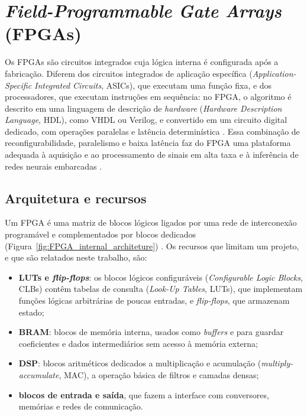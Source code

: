 \section{\textit{Field-Programmable Gate Arrays} (FPGAs)}
\label{sec:FPGA}

Os FPGAs são circuitos integrados cuja lógica interna é configurada após a fabricação. Diferem dos circuitos integrados de aplicação específica (\textit{Application-Specific Integrated Circuits}, ASICs), que executam uma função fixa, e dos processadores, que executam instruções em sequência: no FPGA, o algoritmo é descrito em uma linguagem de descrição de \textit{hardware} (\textit{Hardware Description Language}, HDL), como VHDL ou Verilog, e convertido em um circuito digital dedicado, com operações paralelas e latência determinística \cite{kuon2008fpga,trimberger2015three}. Essa combinação de reconfigurabilidade, paralelismo e baixa latência faz do FPGA uma plataforma adequada à aquisição e ao processamento de sinais em alta taxa e à inferência de redes neurais embarcadas \cite{Shawahna2019}.

\subsection{Arquitetura e recursos}

Um FPGA é uma matriz de blocos lógicos ligados por uma rede de interconexão programável e complementados por blocos dedicados (Figura~\ref{fig:FPGA_internal_architeture}) \cite{langhammer2014design}. Os recursos que limitam um projeto, e que são relatados neste trabalho, são:
\begin{itemize}
	\item \textbf{LUTs e \textit{flip-flops}}: os blocos lógicos configuráveis (\textit{Configurable Logic Blocks}, CLBs) contêm tabelas de consulta (\textit{Look-Up Tables}, LUTs), que implementam funções lógicas arbitrárias de poucas entradas, e \textit{flip-flops}, que armazenam estado;
	\item \textbf{BRAM}: blocos de memória interna, usados como \textit{buffers} e para guardar coeficientes e dados intermediários sem acesso à memória externa;
	\item \textbf{DSP}: blocos aritméticos dedicados a multiplicação e acumulação (\textit{multiply-accumulate}, MAC), a operação básica de filtros e camadas densas;
	\item \textbf{blocos de entrada e saída}, que fazem a interface com conversores, memórias e redes de comunicação.
\end{itemize}

